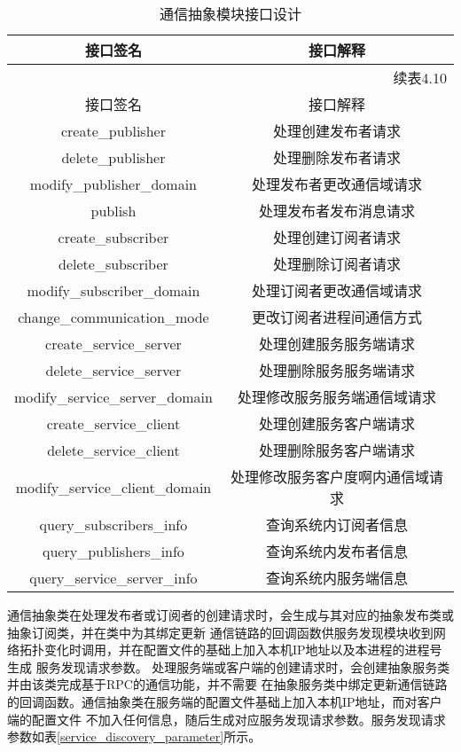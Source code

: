 \begin{longtable}{cc}
  \caption{通信抽象模块接口设计}\label{communication_abstract_interface}\\
  \toprule
  接口签名 & 接口解释 \\
  \midrule
  \endfirsthead
  
  \multicolumn{2}{r}{续表4.10}\\
  \toprule
  接口签名 & 接口解释 \\
  \hline
  \endhead
  
  \endfoot
  
  \bottomrule
  \endlastfoot
  create\_publisher & 处理创建发布者请求\\
  delete\_publisher & 处理删除发布者请求\\
  modify\_publisher\_domain & 处理发布者更改通信域请求\\
  publish & 处理发布者发布消息请求 \\
  create\_subscriber & 处理创建订阅者请求\\
  delete\_subscriber & 处理删除订阅者请求\\
  modify\_subscriber\_domain & 处理订阅者更改通信域请求\\ 
  change\_communication\_mode & 更改订阅者进程间通信方式 \\
  create\_service\_server & 处理创建服务服务端请求\\
  delete\_service\_server & 处理删除服务服务端请求\\
  modify\_service\_server\_domain & 处理修改服务服务端通信域请求\\
  create\_service\_client & 处理创建服务客户端请求\\
  delete\_service\_client & 处理删除服务客户端请求\\
  modify\_service\_client\_domain & 处理修改服务客户度啊内通信域请求\\
  query\_subscribers\_info & 查询系统内订阅者信息\\
  query\_publishers\_info & 查询系统内发布者信息\\
  query\_service\_server\_info & 查询系统内服务端信息\\
  \end{longtable}  

通信抽象类在处理发布者或订阅者的创建请求时，会生成与其对应的抽象发布类或抽象订阅类，并在类中为其绑定更新
通信链路的回调函数供服务发现模块收到网络拓扑变化时调用，并在配置文件的基础上加入本机IP地址以及本进程的进程号生成
服务发现请求参数。
处理服务端或客户端的创建请求时，会创建抽象服务类并由该类完成基于RPC的通信功能，并不需要
在抽象服务类中绑定更新通信链路的回调函数。通信抽象类在服务端的配置文件基础上加入本机IP地址，而对客户端的配置文件
不加入任何信息，随后生成对应服务发现请求参数。服务发现请求参数如表\ref{service_discovery_parameter}所示。


